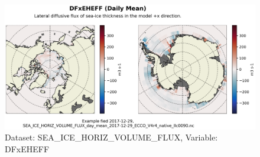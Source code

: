 \begin{figure}[H]
\centering
\includegraphics[scale=0.55]{../images/plots/native_plots/Sea-Ice_and_Snow_Horizontal_Volume_Fluxes/DFxEHEFF.png}
\caption{Dataset: SEA\_ICE\_HORIZ\_VOLUME\_FLUX, Variable: DFxEHEFF}
\label{tab:table-SEA_ICE_HORIZ_VOLUME_FLUX_DFxEHEFF-Plot}
\end{figure}
\pagebreak

